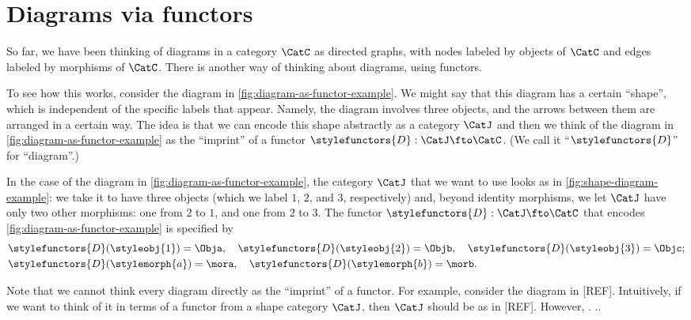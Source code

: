 
\section{Diagrams via functors}


So far, we have been thinking of diagrams in a category $\CatC$ as directed graphs, with nodes labeled by objects of $\CatC$ and edges labeled by morphisms of $\CatC$.
There is another way of thinking about diagrams, using functors.

To see how this works, consider the diagram in \cref{fig:diagram-as-functor-example}.
We might say that this diagram has a certain ``shape'', which is independent of the specific labels that appear.
Namely, the diagram involves three objects, and the arrows between them are arranged in a certain way.
The idea is that we can encode this shape abstractly as a category $\CatJ$ and then we think of the diagram in \cref{fig:diagram-as-functor-example} as the ``imprint'' of a functor $\stylefunctors{D}: \CatJ \fto \CatC$.
(We call it ``$\stylefunctors{D}$'' for ``diagram''.)

\begin{marginfigure}
    \centering
    \caption{}
    \label{fig:diagram-as-functor-example}
\end{marginfigure}

\begin{marginfigure}
    \centering
    \caption{}
    \label{fig:shape-diagram-example}
\end{marginfigure}

In the case of the diagram in \cref{fig:diagram-as-functor-example}, the category $\CatJ$ that we want to use looks as in \cref{fig:shape-diagram-example}: we take it to have three objects (which we label $1$, $2$, and $3$, respectively) and, beyond identity morphisms, we let $\CatJ$ have only two other morphisms: one from $2$ to $1$, and one from $2$ to $3$.
The functor $\stylefunctors{D}: \CatJ \fto \CatC$ that encodes \cref{fig:diagram-as-functor-example} is specified by
\begin{align*}
     & \stylefunctors{D}(\styleobj{1}) = \Obja, \quad \stylefunctors{D}(\styleobj{2}) = \Objb, \quad  \stylefunctors{D}(\styleobj{3}) = \Objc; \\
     & \stylefunctors{D}(\stylemorph{a}) = \mora, \quad \stylefunctors{D}(\stylemorph{b}) = \morb.
\end{align*}

Note that we cannot think every diagram directly as the ``imprint'' of a functor.
For example, consider the diagram in [REF].
Intuitively, if we want to think of it in terms of a functor from a shape category $\CatJ$, then $\CatJ$ should be as in [REF].
However, .
..

